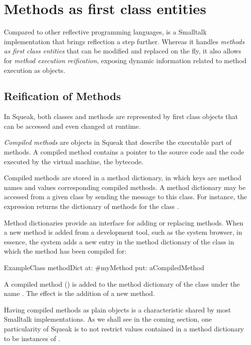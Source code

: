 \documentclass[a4paper,10pt,twoside]{book}
\begin{document}
\section{Methods as first class entities}

Compared to other reflective programming languages, \squeak is a Smalltalk implementation that brings reflection a step further. Whereas it handles \emph{methods as first class entities} that can be modified and replaced on the fly, it also allows for \emph{method execution reification}, exposing dynamic information related to method execution as objects.


\subsection{Reification of Methods} 

In Squeak, both classes and methods are represented by first class objects that can be accessed and even changed at runtime. 

\emph{Compiled methods} are objects in Squeak that describe the executable part of methods. A compiled method contains a pointer to the source code and the code executed by the virtual machine, the bytecode.

Compiled methods are stored in a method dictionary, in which keys are method names and values corresponding compiled methods. A method dictionary may be accessed from a given class by sending the message  to this class. For instance, the expression  returns the dictionary of methods for the class .

Method dictionaries provide an interface for adding or replacing methods. When a new method is added from a development tool, such as the system browser, in essence, the system adds a new entry in the method dictionary of the class in which the method has been compiled for:

\begin{code}{}
ExampleClass methodDict at: #myMethod put: aCompiledMethod
\end{code}

A compiled method () is added to the method dictionary of the class  under the name . The effect is the addition of a new method.

Having compiled methods as plain objects is a characteristic shared by most Smalltalk implementations. As we shall see in the coming section, one particularity of Squeak is to not restrict values contained in a method dictionary to be instances of .
\end{document}

